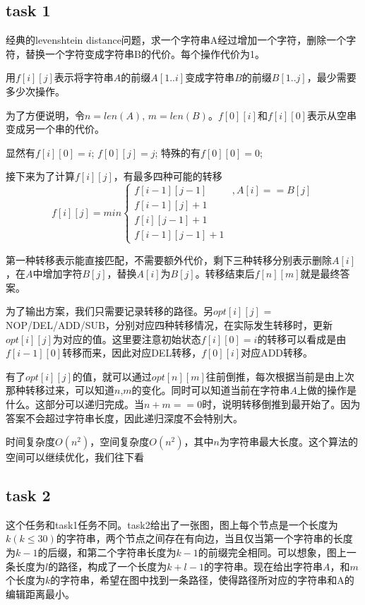 \documentclass[a4paper, 11pt, nofonts, nocap, fancyhdr]{ctexart}
\begin{document}
\subsection{task 1}

经典的levenshtein distance问题，求一个字符串A经过增加一个字符，删除一个字符，替换一个字符变成字符串B的代价。每个操作代价为1。

用$f[i][j]$表示将字符串$A$的前缀$A[1..i]$变成字符串$B$的前缀$B[1..j]$，最少需要多少次操作。

为了方便说明，令$n = len(A)$, $m = len(B)$。$f[0][i]$和$f[i][0]$表示从空串变成另一个串的代价。

显然有$f[i][0] = i$; $f[0][j] = j$; 特殊的有$f[0][0] = 0$;

接下来为了计算$f[i][j]$，有最多四种可能的转移
\begin{equation*}
f[i][j] = min\left\{\begin{matrix}
f[i-1][j-1] & ,A[i] == B[j] \\ 
f[i-1][j] + 1 & \\ 
f[i][j-1] + 1 & \\ 
f[i-1][j-1] + 1 & 
\end{matrix}\right.
\end{equation*}

第一种转移表示能直接匹配，不需要额外代价，剩下三种转移分别表示删除$A[i]$，在$A$中增加字符$B[j]$，替换$A[i]$为$B[j]$。转移结束后$f[n][m]$就是最终答案。

为了输出方案，我们只需要记录转移的路径。另$opt[i][j]$ = NOP/DEL/ADD/SUB，分别对应四种转移情况，在实际发生转移时，更新$opt[i][j]$为对应的值。这里要注意初始状态$f[i][0] = i$的转移可以看成是由$f[i-1][0]$转移而来，因此对应DEL转移，$f[0][i]$对应ADD转移。

有了$opt[i][j]$的值，就可以通过$opt[n][m]$往前倒推，每次根据当前是由上次那种转移过来，可以知道$n$,$m$的变化。同时可以知道当前在字符串$A$上做的操作是什么。这部分可以递归完成。当$n+m == 0$时，说明转移倒推到最开始了。因为答案不会超过字符串长度，因此递归深度不会特别大。

时间复杂度$O(n^{2})$，空间复杂度$O(n^{2})$，其中$n$为字符串最大长度。这个算法的空间可以继续优化，我们往下看


\subsection{task 2}


这个任务和task1任务不同。task2给出了一张图，图上每个节点是一个长度为$k(k \leq 30)$的字符串，两个节点之间存在有向边，当且仅当第一个字符串的长度为$k-1$的后缀，和第二个字符串长度为$k-1$的前缀完全相同。可以想象，图上一条长度为$l$的路径，构成了一个长度为$k+l-1$的字符串。现在给出字符串$A$，和$m$个长度为$k$的字符串，希望在图中找到一条路径，使得路径所对应的字符串和A的编辑距离最小。
\end{document}
